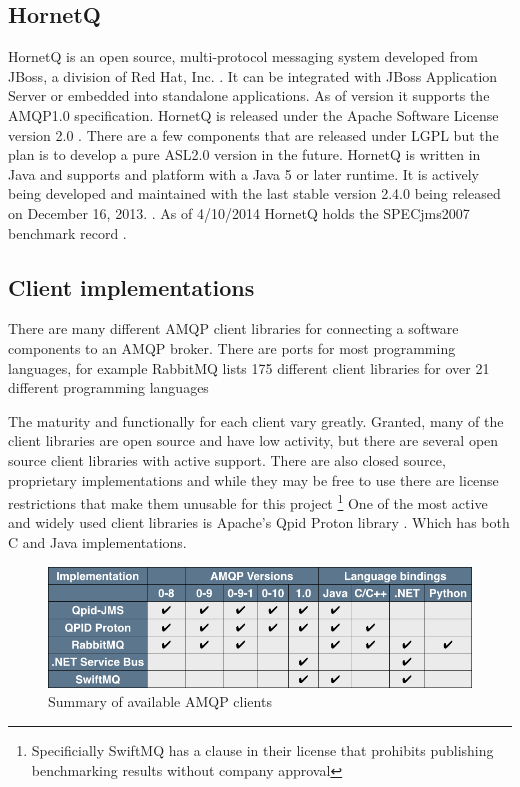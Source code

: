 \documentclass{thesis}
\begin{document}
\subsection{HornetQ}
HornetQ is an open source, multi-protocol messaging system developed from JBoss, a division of Red Hat, Inc. \cite{REDHAT}.  It can be integrated with JBoss Application Server or embedded into standalone applications.  As of version  it supports the AMQP1.0 specification.  HornetQ is released under the Apache Software License version 2.0 .  There are a few components that are released under LGPL  but the plan is to develop a pure ASL2.0 version in the future.  HornetQ is written in Java and supports and platform with a Java 5 or later runtime.   It is actively being developed and maintained with the last stable version 2.4.0 being released on December 16, 2013. \cite{HORNETQ}.  As of 4/10/2014 HornetQ holds the SPECjms2007 benchmark record .  


\subsection{Client implementations}
There are many different AMQP client libraries for connecting a software components to an AMQP broker.  There are ports for most programming languages, for example RabbitMQ lists 175 different client libraries for over 21 different programming languages \cite{RABBITMQ_CLIENTS}

The maturity and functionally for each client vary greatly.  Granted, many of the client libraries are open source and have low activity, but there are several open source client libraries with active support.  There are also closed source, proprietary implementations and while they may be free to use there are license restrictions that make them unusable for this project \footnote{Specificially SwiftMQ has a clause in their license that prohibits publishing benchmarking results without company approval} One of the most active and widely used client libraries is Apache's Qpid Proton library \cite{QPID_PROTON}. 
Which has both C and Java implementations.  

\begin{figure}
\centering
\vspace{2.0in} 
\includegraphics[scale=.5]{client_comparision}  
\caption{Summary of available AMQP clients}
\label{Figure 1}  
\end{figure}
\end{document}
